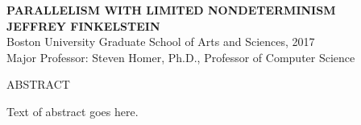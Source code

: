 \thispagestyle{plain}
\begin{center}
  \textbf{\uppercase{Parallelism with limited nondeterminism}}\\
  \textbf{\uppercase{Jeffrey Finkelstein}}\\
  Boston University Graduate School of Arts and Sciences, 2017\\
  Major Professor: Steven Homer, Ph.D., Professor of Computer Science
\end{center}
\begin{center}
  ABSTRACT
\end{center}
Text of abstract goes here.
